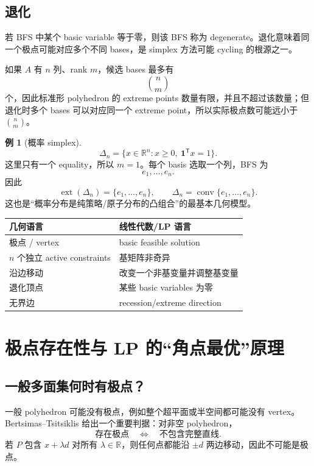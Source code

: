 \documentclass[11pt,a4paper,openany]{ctexrep}
\theoremstyle{definition}
\newtheorem{example}[theorem]{例}
\newcommand{\R}{\mathbb{R}}
\newcommand{\conv}{\operatorname{conv}}
\newcommand{\ext}{\operatorname{ext}}
\newcommand{\transpose}{\mathsf{T}}
\begin{document}
\section{退化}
若 BFS 中某个 basic variable 等于零，则该 BFS 称为 degenerate。退化意味着同一个极点可能对应多个不同 bases，是 simplex 方法可能 cycling 的根源之一。


如果 $A$ 有 $n$ 列、rank $m$，候选 bases 最多有
\[
\binom{n}{m}
\]
个，因此标准形 polyhedron 的 extreme points 数量有限，并且不超过该数量；但退化时多个 bases 可以对应同一个 extreme point，所以实际极点数可能远小于 $\binom{n}{m}$。

\begin{example}[概率 simplex]
\[
\Delta_n=\{x\in\R^n:x\ge0,\ \mathbf 1^\transpose x=1\}.
\]
这里只有一个 equality，所以 $m=1$。每个 basis 选取一个列，BFS 为
\[
e_1,\ldots,e_n.
\]
因此
\[
\ext(\Delta_n)=\{e_1,\ldots,e_n\},\qquad
\Delta_n=\conv\{e_1,\ldots,e_n\}.
\]
这也是“概率分布是纯策略/原子分布的凸组合”的最基本几何模型。
\end{example}

\begin{keybox}[几何与代数翻译表]
\begin{center}
\begin{tabular}{ll}
\toprule
几何语言 & 线性代数/LP 语言\\
\midrule
极点 / vertex & basic feasible solution\\
$n$ 个独立 active constraints & 基矩阵非奇异\\
沿边移动 & 改变一个非基变量并调整基变量\\
退化顶点 & 某些 basic variables 为零\\
无界边 & recession/extreme direction\\
\bottomrule
\end{tabular}
\end{center}
\end{keybox}

\chapter{极点存在性与 LP 的“角点最优”原理}

\section{一般多面集何时有极点？}
一般 polyhedron 可能没有极点，例如整个超平面或半空间都可能没有 vertex。Bertsimas--Tsitsiklis 给出一个重要判据：对非空 polyhedron，
\[
\boxed{\text{存在极点}}
\quad\Longleftrightarrow\quad
\boxed{\text{不包含完整直线}}.
\]
若 $P$ 包含 $x+\lambda d$ 对所有 $\lambda\in\R$，则任何点都能沿 $\pm d$ 两边移动，因此不可能是极点。\cite[Ch.~2, \S2.5]{bertsimas}
\end{document}
